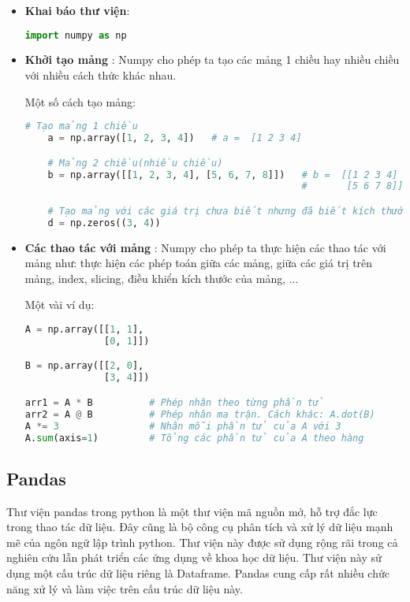 \documentclass[../main-report.tex]{subfiles}
\begin{document}
\begin{itemize}
\item \textbf{Khai báo thư viện}: 
\begin{lstlisting}[language=Python] 
import numpy as np
\end{lstlisting}
\item \textbf{Khởi tạo mảng} : Numpy cho phép ta tạo các mảng 1 chiều hay nhiều chiều với nhiều cách thức khác nhau.

\begin{example}
    Một số cách tạo mảng:
\begin{lstlisting}[language=Python] 
    # Tạo mảng 1 chiều
    a = np.array([1, 2, 3, 4])   # a =  [1 2 3 4]

    # Mảng 2 chiều(nhiều chiều)
    b = np.array([[1, 2, 3, 4], [5, 6, 7, 8]])   # b =  [[1 2 3 4]
                                                 #       [5 6 7 8]]

    # Tạo mảng với các giá trị chưa biết nhưng đã biết kích thước
    d = np.zeros((3, 4))

\end{lstlisting}
\end{example}
\item \textbf{Các thao tác với mảng} : Numpy cho phép ta thực hiện các thao tác với mảng như: thực hiện các phép toán giữa các mảng, giữa các giá trị trên mảng, index, slicing, điều khiển kích thước của mảng, ...
\begin{example}
Một vài ví dụ:
\begin{lstlisting}[language=Python]
A = np.array([[1, 1], 
              [0, 1]])

B = np.array([[2, 0],
              [3, 4]])

arr1 = A * B          # Phép nhân theo từng phần tử
arr2 = A @ B          # Phép nhân ma trận. Cách khác: A.dot(B)
A *= 3                # Nhân mỗi phần tử của A với 3
A.sum(axis=1)         # Tổng các phần tử của A theo hàng

\end{lstlisting}
\end{example}
\end{itemize}

\subsection{Pandas}
Thư viện pandas trong python là một thư viện mã nguồn mở, hỗ trợ đắc lực trong
thao tác dữ liệu. Đây cũng là bộ công cụ phân tích và xử lý dữ liệu mạnh mẽ của ngôn
ngữ lập trình python. Thư viện này được sử dụng rộng rãi trong cả nghiên cứu lẫn phát
triển các ứng dụng về khoa học dữ liệu. Thư viện này sử dụng một cấu trúc dữ liệu riêng
là Dataframe. Pandas cung cấp rất nhiều chức năng xử lý và làm việc trên cấu trúc dữ liệu
này.
\end{document}
